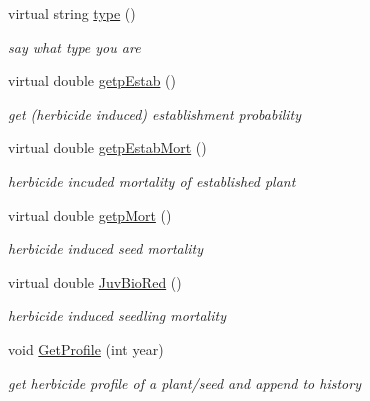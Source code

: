\begin{DoxyCompactItemize}
\mbox{\label{class_c_t_d_seed_af15f2e2f2ce991668da778d421b8a4ee}} 
virtual string \mbox{\hyperlink{class_c_t_d_seed_af15f2e2f2ce991668da778d421b8a4ee}{type}} ()
\begin{DoxyCompactList}\small\item\em say what type you are \end{DoxyCompactList}\item 
virtual double \mbox{\hyperlink{class_c_t_d_seed_a0e62cd8894a79f484cdacfb026839609}{getp\+Estab}} ()
\begin{DoxyCompactList}\small\item\em get (herbicide induced) establishment probability \end{DoxyCompactList}\item 
virtual double \mbox{\hyperlink{class_c_t_d_seed_a94a46b8a2c8b176f3b39ee6671dd16bf}{getp\+Estab\+Mort}} ()
\begin{DoxyCompactList}\small\item\em herbicide incuded mortality of established plant \end{DoxyCompactList}\item 
\mbox{\label{class_c_t_d_seed_ac7aa40e91c58574297dfa46fafd5bd14}} 
virtual double \mbox{\hyperlink{class_c_t_d_seed_ac7aa40e91c58574297dfa46fafd5bd14}{getp\+Mort}} ()
\begin{DoxyCompactList}\small\item\em herbicide induced seed mortality \end{DoxyCompactList}\item 
\mbox{\label{class_c_t_d_seed_ac1fbe05e6ccd86a88cd397f1c504fe36}} 
virtual double \mbox{\hyperlink{class_c_t_d_seed_ac1fbe05e6ccd86a88cd397f1c504fe36}{Juv\+Bio\+Red}} ()
\begin{DoxyCompactList}\small\item\em herbicide induced seedling mortality \end{DoxyCompactList}\item 
void \mbox{\hyperlink{class_c_t_d_seed_a93b488e96ce97a9b6f780ccc0c72e25c}{Get\+Profile}} (int year)
\begin{DoxyCompactList}\small\item\em get herbicide profile of a plant/seed and append to history \end{DoxyCompactList}\item 

\end{DoxyCompactItemize}
